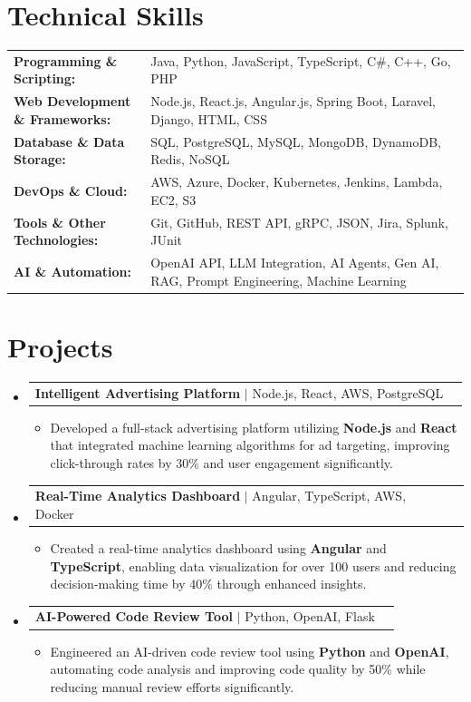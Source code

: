 \documentclass[letterpaper,10pt]{article}
\makeatletter
\newcommand{\resumeItem}[1]{
  \item{\fontsize{8pt}{9pt}\selectfont
    #1 \vspace{-3pt}
  }
}
\newcommand{\resumeProjectHeading}[2]{
    \item
    \begin{tabular*}{1.001\textwidth}{l@{\extracolsep{\fill}}r}
      \fontsize{8.5pt}{10pt}#1 & \textbf{\fontsize{8.5pt}{10pt} #2}\\
    \end{tabular*}\vspace{-7pt}
}
\newcommand{\resumeSubHeadingListStart}{\begin{itemize}[leftmargin=0pt, label={}]}
\newcommand{\resumeSubHeadingListEnd}{\end{itemize}}
\newcommand{\resumeItemListStart}{\begin{itemize}[leftmargin=*]}
\newcommand{\resumeItemListEnd}{\end{itemize}\vspace{-5pt}}
\makeatother
\begin{document}
\section{Technical Skills}
        \vspace{-14pt}
        \begin{table}[h]
            \fontsize{8pt}{9pt}\selectfont
            \begin{tabular}{p{0.3\linewidth} p{0.7\linewidth}}
                \textbf{Programming \& Scripting:} & Java, Python, JavaScript, TypeScript, C\#, C++, Go, PHP \\
                \textbf{Web Development \& Frameworks:} & Node.js, React.js, Angular.js, Spring Boot, Laravel, Django, HTML, CSS \\
                \textbf{Database \& Data Storage:} & SQL, PostgreSQL, MySQL, MongoDB, DynamoDB, Redis, NoSQL \\
                \textbf{DevOps \& Cloud:} & AWS, Azure, Docker, Kubernetes, Jenkins, Lambda, EC2, S3 \\
                \textbf{Tools \& Other Technologies:} & Git, GitHub, REST API, gRPC, JSON, Jira, Splunk, JUnit \\
                \textbf{AI \& Automation:} & OpenAI API, LLM Integration, AI Agents, Gen AI, RAG, Prompt Engineering, Machine Learning \\
            \end{tabular}
        \end{table}
 \vspace{-18pt}

\section{Projects}
    \vspace{-5pt}
    \resumeSubHeadingListStart
          \resumeProjectHeading
            {\textbf{Intelligent Advertising Platform} $|$ Node.js, React, AWS, PostgreSQL}{}
            \resumeItemListStart
                \resumeItem{Developed a full-stack advertising platform utilizing \textbf{Node.js} and \textbf{React} that integrated machine learning algorithms for ad targeting, improving click-through rates by 30\% and user engagement significantly.}
            \resumeItemListEnd
        \vspace{-12pt}
    
        \resumeProjectHeading
            {\textbf{Real-Time Analytics Dashboard} $|$ Angular, TypeScript, AWS, Docker}{}
        \resumeItemListStart
                \resumeItem{Created a real-time analytics dashboard using \textbf{Angular} and \textbf{TypeScript}, enabling data visualization for over 100 users and reducing decision-making time by 40\% through enhanced insights.}
        \resumeItemListEnd
      \vspace{-12pt}
      \resumeProjectHeading
        {\textbf{AI-Powered Code Review Tool} $|$ Python, OpenAI, Flask}{}
    \resumeItemListStart
            \resumeItem{Engineered an AI-driven code review tool using \textbf{Python} and \textbf{OpenAI}, automating code analysis and improving code quality by 50\% while reducing manual review efforts significantly.}
    \resumeItemListEnd
    \resumeSubHeadingListEnd
\end{document}

